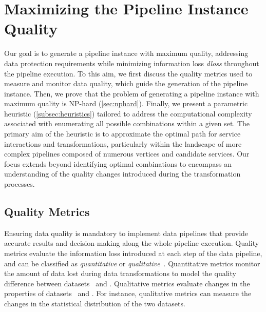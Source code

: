 \section{Maximizing the Pipeline Instance Quality}\label{sec:heuristics}
%
Our goal is to generate a pipeline instance with maximum quality, addressing data protection requirements while minimizing information loss \textit{dloss} throughout the pipeline execution. To this aim, we first discuss the quality metrics used to measure and monitor data quality, which guide the generation of the pipeline instance. Then, we prove that the problem of generating a pipeline instance with maximum quality is NP-hard (\cref{sec:nphard}). Finally, we present a parametric heuristic (\cref{subsec:heuristics}) tailored to address the computational complexity associated with enumerating all possible combinations within a given set. The primary aim of the heuristic is to approximate the optimal path for service interactions and transformations, particularly within the landscape of more complex pipelines composed of numerous vertices and candidate services. Our focus extends beyond identifying optimal combinations to encompass an understanding of the quality changes introduced during the transformation processes.


\subsection{Quality Metrics}\label{subsec:metrics}
Ensuring data quality is mandatory to implement data pipelines that provide accurate results and decision-making along the whole pipeline execution. Quality metrics evaluate the information loss introduced at each step of the data pipeline, and can be classified as \emph{quantitative} or \emph{qualitative}~\cite{ADD}.
Quantitative metrics monitor the amount of data lost during data transformations to model the quality difference between datasets \origdataset\ and \transdataset.
Qualitative metrics evaluate changes in the properties of datasets \origdataset\ and \transdataset. For instance, qualitative metrics can measure the changes in the statistical distribution of the two datasets.

